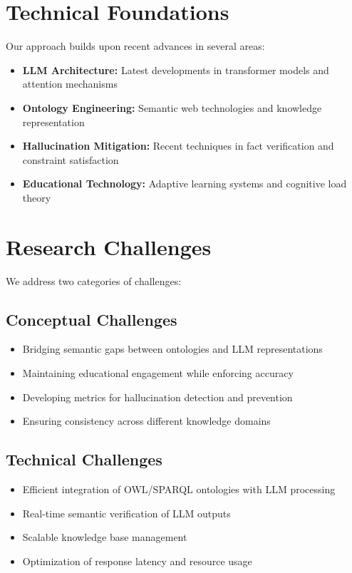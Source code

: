 \section{Technical Foundations}

Our approach builds upon recent advances in several areas:

\begin{itemize}
    \item \textbf{LLM Architecture:} Latest developments in transformer models and attention mechanisms \cite{zhang2024survey}
    \item \textbf{Ontology Engineering:} Semantic web technologies and knowledge representation \cite{doubletaken2024llm}
    \item \textbf{Hallucination Mitigation:} Recent techniques in fact verification and constraint satisfaction \cite{ji2023survey}
    \item \textbf{Educational Technology:} Adaptive learning systems and cognitive load theory
\end{itemize}

\section{Research Challenges}

We address two categories of challenges:

\subsection{Conceptual Challenges}
\begin{itemize}
    \item Bridging semantic gaps between ontologies and LLM representations
    \item Maintaining educational engagement while enforcing accuracy
    \item Developing metrics for hallucination detection and prevention
    \item Ensuring consistency across different knowledge domains
\end{itemize}

\subsection{Technical Challenges}
\begin{itemize}
    \item Efficient integration of OWL/SPARQL ontologies with LLM processing
    \item Real-time semantic verification of LLM outputs
    \item Scalable knowledge base management
    \item Optimization of response latency and resource usage
\end{itemize}

